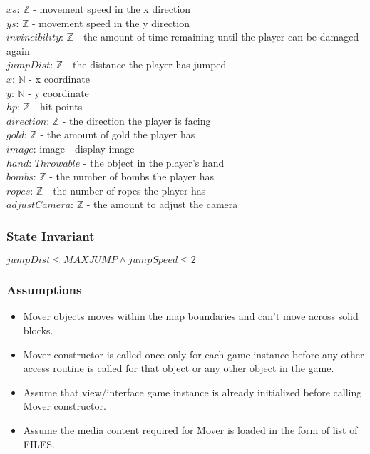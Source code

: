 \documentclass[12pt]{article}
\begin{document}
$xs$: $\mathbb{Z}$ - movement speed in the x direction\\
$ys$: $\mathbb{Z}$ - movement speed in the y direction\\
$invincibility$: $\mathbb{Z}$ - the amount of time remaining until the player can be damaged again\\
$jumpDist$: $\mathbb{Z}$ - the distance the player has jumped\\
$x$: $\mathbb{N}$ - x coordinate\\
$y$: $\mathbb{N}$ - y coordinate\\
$hp$: $\mathbb{Z}$ - hit points\\
$direction$: $\mathbb{Z}$ - the direction the player is facing\\
$gold$: $\mathbb{Z}$ - the amount of gold the player has\\
$image$: image - display image\\
$hand$: $Throwable$ - the object in the player's hand\\
$bombs$: $\mathbb{Z}$ - the number of bombs the player has\\
$ropes$: $\mathbb{Z}$ - the number of ropes the player has\\
$adjustCamera$: $\mathbb{Z}$ - the amount to adjust the camera

\subsubsection*{State Invariant}

$jumpDist \leq MAXJUMP \land jumpSpeed \leq 2$

\subsubsection*{Assumptions}

\begin{itemize}
    \item Mover objects moves within the map boundaries and can't move across solid blocks.
    \item Mover constructor is called once only for each game instance before any other access routine is called for that object or any other object in the game.
    \item Assume that view/interface game instance is already initialized before calling Mover constructor.
    \item Assume the media content required for Mover is loaded in the form of list of FILES.
\end{itemize}
\end{document}
